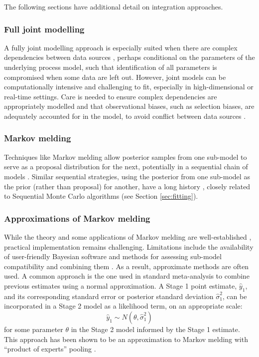 \documentclass{article}
\begin{document}
The following sections have additional detail on integration approaches.

\subsubsection{Full joint modelling}\label{sec:joint}

A fully joint modelling approach is especially suited when there are complex dependencies between data sources \citep{corbella2022inferring}, perhaps conditional on the parameters of the underlying process model, such that identification of all parameters is compromised when some data are left out. However, joint models can be computationally intensive and challenging to fit, especially in high-dimensional or real-time settings. Care is needed to ensure complex dependencies are appropriately modelled and that observational biases, such as selection biases, are adequately accounted for in the model, to avoid conflict between data sources \citep{presanis2013conflict,corbella2022inferring}. 

\subsubsection{Markov melding} Techniques like Markov melding \citep{goudie2019joining} allow posterior samples from one sub-model to serve as a proposal distribution for the next, potentially in a sequential chain of models \citep{manderson2023combining}. Similar sequential strategies, using the posterior from one sub-model as the prior (rather than proposal) for another, have a long history \citep{west1997bayesian}, closely related to Sequential Monte Carlo algorithms \citep{doucet2001introduction} (see Section \ref{sec:fitting}).

\subsubsection{Approximations of Markov melding} While the theory and some applications of Markov melding are well-established \citep{goudie2019joining,nicholson2022interoperability,manderson2023combining}, practical implementation remains challenging. Limitations include the availability of user-friendly Bayesian software and methods for assessing sub-model compatibility and combining them \citep{yang2025detecting}. As a result, approximate methods are often used. A common approach is the one used in standard meta-analysis \citep{borenstein2021introduction} to combine previous estimates using a normal approximation. A Stage 1 point estimate, $\hat{y}_1$, and its corresponding standard error or posterior standard deviation $\hat{\sigma}^2_1$, can be incorporated in a Stage 2 model as a likelihood term, on an appropriate scale:
$$
\hat{y}_1 \sim N(\theta, \hat{\sigma}^2_1)
$$ for some parameter $\theta$ in the Stage 2 model informed by the Stage 1 estimate. This approach has been shown to be an approximation to Markov melding with ``product of experts'' pooling \citep{goudie2019joining}.
\end{document}

